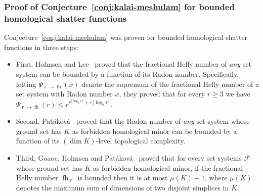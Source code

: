 \documentclass[11pt]{article}
\newcommand{\F}{\mathcal{F}}
\DeclareMathOperator{\rad}{r}
\DeclareMathOperator{\fh}{fh}
\begin{document}
\subsubsection{Proof of Conjecture~\ref{conj:kalai-meshulam} for bounded homological shatter functions}
%
Conjecture~\ref{conj:kalai-meshulam} was proven for bounded homological shatter functions in three steps: 
%
\begin{itemize}
\item First, Holmsen and Lee~\cite[Theorem~1.1]{Holmsen2021} proved that the fractional Helly number of \emph{any} set system can be bounded by a function of its Radon number. Specifically, letting $\Psi_{\rad \to \fh}(x)$ denote the supremum of the fractional Helly number of a set system with Radon number $x$, they proved  that for every $r \ge 3$ we have $\Psi_{\rad \to \fh}(r) \le r^{r^{\lceil \log_2r \rceil}+r\lceil \log_2r \rceil}$.\medskip
%
\item Second, Patáková~\cite[Theorem~2.1]{patakova2022bounding} proved that the Radon number of \emph{any} set system whose ground set has $K$ as forbidden homological minor can be bounded by a function of its $(\dim K)$-level topological complexity.\medskip
%
\item Third, Goaoc, Holmsen and Patáková~\cite[Theorem~1.2]{steppingUp} proved that for every set systems $\F$ whose ground set has $K$ as forbidden homological minor, if the fractional Helly number $\fh_\F$ is bounded then it is at most $\mu(K)+1$, where $\mu(K)$ denotes the maximum sum of dimensions of two disjoint simplices in $K$.
\end{itemize}
%
%
%
\end{document}
